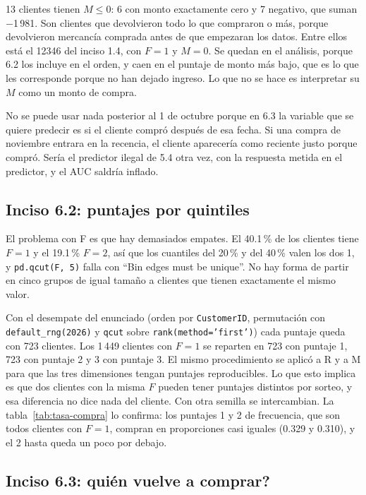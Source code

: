 \documentclass[11pt]{article}
\begin{document}
13 clientes tienen $M\le0$: 6 con monto exactamente cero y 7 negativo, que suman
$-$\textsterling{}1\,981. Son clientes que devolvieron todo lo que compraron o más, porque devolvieron
mercancía comprada antes de que empezaran los datos. Entre ellos está el 12346 del inciso 1.4, con
$F=1$ y $M=0$. Se quedan en el análisis, porque 6.2 los incluye en el orden, y caen en el
puntaje de monto más bajo, que es lo que les corresponde porque no han dejado ingreso. Lo que no
se hace es interpretar su $M$ como un monto de compra.

No se puede usar nada posterior al 1 de octubre porque en 6.3 la variable que se quiere predecir
es si el cliente compró después de esa fecha. Si una compra de noviembre entrara en la recencia,
el cliente aparecería como reciente justo porque compró. Sería el predictor ilegal de 5.4 otra
vez, con la respuesta metida en el predictor, y el AUC saldría inflado.

\subsection*{Inciso 6.2: puntajes por quintiles}

El problema con F es que hay demasiados empates. El 40.1\,\% de los clientes tiene $F=1$ y el
19.1\,\% $F=2$, así que los cuantiles del 20\,\% y del 40\,\% valen los dos 1, y
\texttt{pd.qcut(F, 5)} falla con ``Bin edges must be unique''. No hay forma de partir en cinco
grupos de igual tamaño a clientes que tienen exactamente el mismo valor.

Con el desempate del enunciado (orden por \texttt{CustomerID}, permutación con
\texttt{default\_rng(2026)} y \texttt{qcut} sobre \texttt{rank(method='first')}) cada puntaje
queda con 723 clientes. Los 1\,449 clientes con $F=1$ se reparten en 723 con puntaje 1, 723 con
puntaje 2 y 3 con puntaje 3. El mismo procedimiento se aplicó a R y a M para que las tres
dimensiones tengan puntajes reproducibles. Lo que esto implica es que dos clientes con la misma
$F$ pueden tener puntajes distintos por sorteo, y esa diferencia no dice nada del cliente. Con
otra semilla se intercambian. La tabla~\ref{tab:tasa-compra} lo confirma: los puntajes 1 y 2 de
frecuencia, que son todos clientes con $F=1$, compran en proporciones casi iguales (0.329 y
0.310), y el 2 hasta queda un poco por debajo.

\subsection*{Inciso 6.3: \textquestiondown{}quién vuelve a comprar?}
\end{document}
